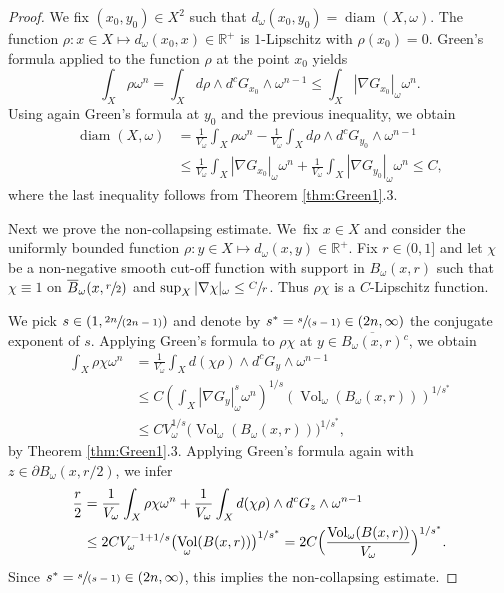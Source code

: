 \documentclass[11pt]{article}
\numberwithin{equation}{section}
\newcommand{\spfrac}[2]{\sfrac{#1}{(#2)}}
\DeclareMathOperator{\diam}{diam}
\DeclareMathOperator{\Vol}{Vol}
\theoremstyle{definition}
\begin{document}
\begin{proof}
We fix $(x_0,y_0)\in X^2$ such that $d_\omega(x_0,y_0)=\diam(X, \omega)$.
The function $\rho: x \in X \mapsto d_\omega(x_0, x) \in \mathbb{R}^+$ is $1$-Lipschitz
with $\rho(x_0)=0$. Green's formula applied to the function $\rho$ at the point $x_0$ yields
\[
\int_X \rho \omega^n =\int_X d \rho \wedge d^c G_{x_0} \wedge\omega^{n-1} \leq \int_X |\nabla G_{x_0}|_{\omega}\omega^n .
\]
Using again Green's formula at $y_0$ and the previous inequality, we obtain
\begin{align*}
\diam(X, \omega)
&= \frac{1}{V_\omega} \int_X \rho\omega^n - \frac{1}{V_\omega} \int_X d \rho \wedge d^c G_{y_0} \wedge\omega^{n-1}\\
&\leq  \frac{1}{V_\omega}\int_X |\nabla G_{x_0}|_{\omega}\omega^n
+\frac{1}{V_\omega}\int_X |\nabla G_{y_0}|_{\omega}\omega^n \leq C,
\end{align*}
where the last inequality follows from Theorem \ref{thm:Green1}.3.

Next we prove the non-collapsing estimate. We~fix $x \in X$ and consider the uniformly bounded function $\rho: y \in X \mapsto d_\omega(x, y) \in \mathbb{R}^+$.
Fix $r\in (0,1]$ and let $\chi$ be a non-negative smooth cut-off function with support in $B_\omega(x, r)$ such that
$\chi\equiv 1$ on $\overline{B}_\omega(x, \sfrac{r}{2}) $ and $\sup_X |\nabla \chi|_\omega \leq \sfrac{C}{r}$.
Thus $\rho \chi$ is a $C$-Lipschitz function.

We pick $s\in (1, \spfrac{2n}{2n-1})$ and denote by $s^*=\spfrac{s}{s-1} \in (2n, \infty)$ the conjugate exponent of $s$.
Applying Green's formula to $\rho \chi$ at $y\in \overline{B_{\omega}(x,r )}{}^c $, we obtain
\begin{align*}
\int_X \rho\chi \omega^n &= \frac{1}{V_\omega} \int_X d(\chi \rho) \wedge d^c G_y \wedge \omega^{n-1} \\
&\leq C
\left(\int_X |\nabla G_y|^s_\omega \omega^n\right)^{1/s} \left(\Vol_\omega(B_{\omega}(x,r)) \right)^{1/s^*}\\
&\leq CV_\omega^{1/s} \bigl(\Vol_\omega(B_{\omega}(x,r)) \bigr)^{1/s^*},
\end{align*}
by Theorem \ref{thm:Green1}.3.
Applying Green's formula again with $z\in \partial B_\omega(x, r/2)$, we infer
\begin{align*}
\frac{r}{2} &=\frac{1}{V_\omega} \int_X \rho\chi \omega^n
+ \frac{1}{V_\omega} \int_X d(\chi \rho) \wedge d^c G_z \wedge \omega^{n-1} \\
&\leq 2CV_\omega^{-1+1/s} \bigl(\Vol_\omega(B(x,r)) \bigr)^{1/s^*}= 2C\Bigl( \frac{\Vol_\omega(B(x,r)) }{V_\omega} \Bigr)^{1/s^*}.
\end{align*}
Since $s^*=\spfrac{s}{s-1}\in (2n, \infty)$, this implies the non-collapsing estimate.


\end{proof}
\end{document}
